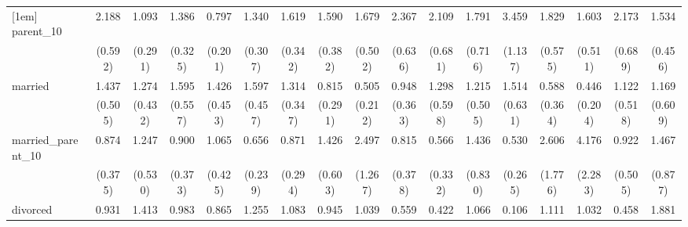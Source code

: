 {\begin{tabular}{l*{16}{c}}
[1em]
parent\_10           &       2.188\sym{**} &       1.093         &       1.386         &       0.797         &       1.340         &       1.619\sym{*}  &       1.590         &       1.679         &       2.367\sym{**} &       2.109\sym{*}  &       1.791         &       3.459\sym{***}&       1.829         &       1.603         &       2.173\sym{*}  &       1.534         \\
                    &     (0.592)         &     (0.291)         &     (0.325)         &     (0.201)         &     (0.307)         &     (0.342)         &     (0.382)         &     (0.502)         &     (0.636)         &     (0.681)         &     (0.716)         &     (1.137)         &     (0.575)         &     (0.511)         &     (0.689)         &     (0.456)         \\
[1em]
married             &       1.437         &       1.274         &       1.595         &       1.426         &       1.597         &       1.314         &       0.815         &       0.505         &       0.948         &       1.298         &       1.215         &       1.514         &       0.588         &       0.446         &       1.122         &       1.169         \\
                    &     (0.505)         &     (0.432)         &     (0.557)         &     (0.453)         &     (0.457)         &     (0.347)         &     (0.291)         &     (0.212)         &     (0.363)         &     (0.598)         &     (0.505)         &     (0.631)         &     (0.364)         &     (0.204)         &     (0.518)         &     (0.609)         \\
[1em]
married\_parent\_10   &       0.874         &       1.247         &       0.900         &       1.065         &       0.656         &       0.871         &       1.426         &       2.497         &       0.815         &       0.566         &       1.436         &       0.530         &       2.606         &       4.176\sym{**} &       0.922         &       1.467         \\
                    &     (0.375)         &     (0.530)         &     (0.373)         &     (0.425)         &     (0.239)         &     (0.294)         &     (0.603)         &     (1.267)         &     (0.378)         &     (0.332)         &     (0.830)         &     (0.265)         &     (1.776)         &     (2.283)         &     (0.505)         &     (0.877)         \\
[1em]
divorced            &       0.931         &       1.413         &       0.983         &       0.865         &       1.255         &       1.083         &       0.945         &       1.039         &       0.559         &       0.422         &       1.066         &       0.106\sym{*}  &       1.111         &       1.032         &       0.458         &       1.881         \\

\end{tabular}}
